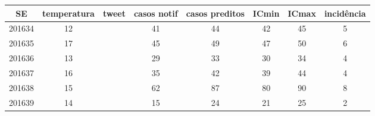 \begin{tabular}{c|ccccccc}
  \hline
SE & temperatura & tweet & casos notif & casos preditos & ICmin & ICmax & incidência \\ 
  \hline
201634 & 12 &  & 41 & 44 & 42 & 45 & 5 \\ 
  201635 & 17 &  & 45 & 49 & 47 & 50 & 6 \\ 
  201636 & 13 &  & 29 & 33 & 30 & 34 & 4 \\ 
  201637 & 16 &  & 35 & 42 & 39 & 44 & 4 \\ 
  201638 & 15 &  & 62 & 87 & 80 & 90 & 8 \\ 
  201639 & 14 &  & 15 & 24 & 21 & 25 & 2 \\ 
   \hline
\end{tabular}
